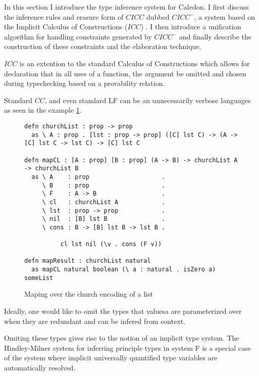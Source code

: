 In this section I introduce the type inference system for Caledon. 
I first discuss the inference rules and 
erasure form of $CICC$ dubbed $CICC^-$, 
a system based on the Implicit Calculus of Constructions ($ICC$) \citep{pollack1990implicit}. 
I then introduce a unification algorithm for handling constraints generated by $CICC^-$ and finally 
describe the construction of these constraints and the elaboration technique.

$ICC$ is an extention to the standard Calculus of Constructions which allows
for declaration that in all uses of a function, the argument be omitted 
and chosen during typechecking based on a provability relation.

Standard $CC$, and even standard LF 
can be an unnecessarily verbose languages as seen in the example \ref{code:long}.

\begin{figure}[h]
\begin{lstlisting}
defn churchList : prop -> prop
  as \ A : prop . [lst : prop -> prop] ([C] lst C) -> (A -> [C] lst C -> lst C) -> [C] lst C

defn mapCL : [A : prop] [B : prop] (A -> B) -> churchList A -> churchList B
  as \ A    : prop                    . 
     \ B    : prop                    .
     \ F    : A -> B                  . 
     \ cl   : churchList A            .
     \ lst  : prop -> prop            .
     \ nil  : [B] lst B               .
     \ cons : B -> [B] lst B -> lst B .

          cl lst nil (\v . cons (F v))

defn mapResult : churchList natural
  as mapCL natural boolean (\ a : natural . isZero a) someList

\end{lstlisting}
\caption{Maping over the church encoding of a list}
\label{code:long}
\end{figure}

Ideally, one would like to omit the types that valuesa are parameterized over when they are redundant
and can be infered from context. 

Omiting these types gives rise to the notion of an implicit type system.  
The Hindley-Milner \citep{hindley1969principal} system for inferring principle types in system F
is a special case of the system where implicit universally quantified type variables are automatically
resolved.